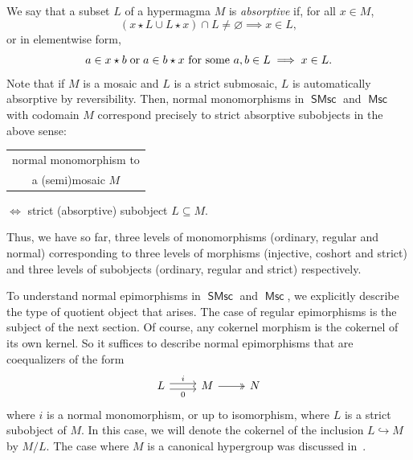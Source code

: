 \documentclass[reqno]{amsart}
\newcommand{\cat}[1]{\ensuremath{\mathsf{#1}}}
\DeclareMathOperator{\Msc}{\cat{Msc}}
\DeclareMathOperator{\SMsc}{\cat{SMsc}}
\numberwithin{equation}{section}
\theoremstyle{plain}
\theoremstyle{definition}
\begin{document}
We say that a subset $L$ of a hypermagma $M$ is \emph{absorptive} if, for all $x \in M$,
\[
(x \star L \cup L\star x) \cap L \neq \varnothing \implies x \in L,
\] or in elementwise form,
\[
a \in x \star b \hspace{1mm} \text{or} \hspace{1mm} a\in b\star x \mbox{ for some } a,b \in L \implies x \in L.
\]
Note that if $M$ is a mosaic and $L$ is a strict submosaic, $L$ is automatically absorptive by reversibility. 
Then, normal monomorphisms in $\SMsc$ and $\Msc$ with codomain $M$ correspond precisely to strict absorptive subobjects in the above sense:
\begin{center}
\begin{tabular}{c}
normal monomorphism to \\
a (semi)mosaic $M$ \end{tabular}
$\iff$ strict (absorptive) subobject $L \subseteq M$.
\end{center}
Thus, we have so far, three levels of monomorphisms (ordinary, regular and normal) corresponding to three levels of morphisms (injective, coshort and strict) and three levels of subobjects (ordinary, regular and strict) respectively.

To understand normal epimorphisms in $\SMsc$ and $\Msc$, we explicitly describe the type of quotient object that arises. The case of regular epimorphisms is the subject of the next section. Of course, any cokernel morphism is the cokernel of its own kernel. So it suffices to describe normal epimorphisms that are coequalizers of the form
\[
\begin{tikzcd}
L \ar[r, shift left, "i"] \ar[r, shift right, swap, "0"] & M \ar[r, twoheadrightarrow] & N
\end{tikzcd}
\]
where $i$ is a normal monomorphism, or up to isomorphism, where $L$ is a strict subobject of $M$. In this case, we will denote the cokernel of the inclusion $L \hookrightarrow M$ by $M/L$. The case where $M$ is a canonical hypergroup was discussed in~\cite[Section~3]{Jun:geometry}.
\end{document}
